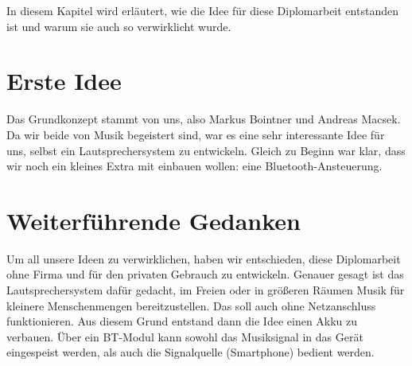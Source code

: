 In diesem Kapitel wird erläutert, wie die Idee für diese Diplomarbeit entstanden ist und warum sie auch so verwirklicht wurde.

\section{Erste Idee} \label{sec:1.1}
Das Grundkonzept stammt von uns, also Markus Bointner und Andreas Macsek. Da wir beide von Musik begeistert sind, war es eine sehr interessante Idee für uns, selbst ein Lautsprechersystem zu entwickeln. Gleich zu Beginn war klar, dass wir noch ein kleines Extra mit einbauen wollen: eine Bluetooth-Ansteuerung.

\section{Weiterführende Gedanken} \label{sec:1.2}
Um all unsere Ideen zu verwirklichen, haben wir entschieden, diese Diplomarbeit ohne Firma und für den privaten Gebrauch zu entwickeln. Genauer gesagt ist das Lautsprechersystem dafür gedacht, im Freien oder in größeren Räumen Musik für kleinere Menschenmengen bereitzustellen. Das soll auch ohne Netzanschluss funktionieren. Aus diesem Grund entstand dann die Idee einen Akku zu verbauen. Über ein BT-Modul kann sowohl das Musiksignal in das Gerät eingespeist werden, als auch die Signalquelle (Smartphone) bedient werden.
